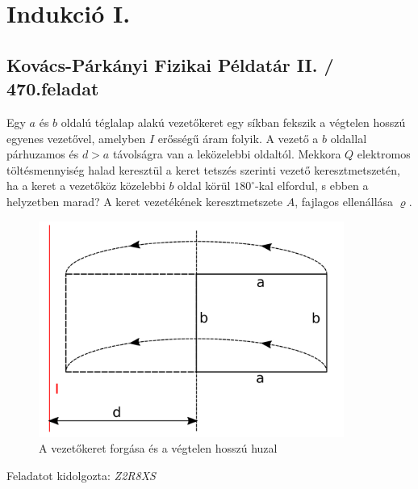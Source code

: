 \documentclass[11pt,a4paper,openany,leqno]{article}
\begin{document}
\section{Indukció I.}
\subsection{Kovács-Párkányi Fizikai Példatár II. / 470.feladat}


 \indent
Egy $a$ és $b$ oldalú téglalap alakú vezetőkeret egy síkban fekszik a végtelen hosszú egyenes vezetővel, amelyben $I$ erősségű áram folyik. A vezető a $b$ oldallal párhuzamos és $d>a$ távolságra van a leközelebbi oldaltól. Mekkora $Q$ elektromos töltésmennyiség halad keresztül a keret tetszés szerinti vezető keresztmetszetén, ha a keret a vezetőköz közelebbi $b$ oldal körül $180 ^{\circ} $-kal elfordul, s ebben a helyzetben marad? A keret vezetékének keresztmetszete $A$, fajlagos ellenállása $\varrho$.

\begin{figure}[h!]
\centering
  \includegraphics[width=100mm,scale=0.5]{kep1.pdf}
  \caption{A vezetőkeret forgása és a végtelen hosszú huzal}
  \label{}
\end{figure} 


\begin{flushright} {Feladatot kidolgozta: {\it Z2R8XS}} \end{flushright}

\vspace{0.5cm}
\end{document}
